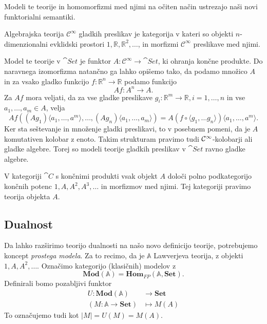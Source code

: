 \documentclass[../kategoricna_logika.tex]{subfiles}
\begin{document}
Modeli te teorije in homomorfizmi med njimi na očiten način ustrezajo naši novi
funktorialni semantiki.
\begin{primer}
Algebrajska teorija \(\mathcal{C}^{\infty}\) gladkih preslikav je kategorija
v kateri so objekti $n$-dimenzionalni evklidski prostori \(1, \mathbb{R}, \mathbb{R}^2, \ldots\),
in morfizmi \(\mathcal{C}^{\infty}\) preslikave med njimi.

Model te teorije v \(\cat{Set}\) je funktor \(A : \mathcal{C}^{\infty} \to \cat{Set}\),
ki ohranja končne produkte. Do naravnega izomorfizma natančno ga lahko opišemo tako, da
podamo množico \(A\) in za vsako gladko funkcijo \(f : \mathbb{R}^n \to \mathbb{R}\)
podamo funkcijo
\[Af : A^n \to A.\]
Za \(Af\) mora veljati, da za vse gladke preslikave
\(g_i : \mathbb{R}^m \to \mathbb{R}, i = 1, \ldots, n\) in vse \(a_1, \ldots, a_m \in A\),
velja
\[ 
   Af \left( (Ag_1)\langle a_1, \ldots, a^m \rangle, \ldots, (Ag_n)\langle a_1, \ldots, a_m \rangle \right) =
   A(f \circ \langle g_1, \ldots g_n \rangle)\langle a_1, \ldots, a^m \rangle.
\]
Ker sta seštevanje in množenje gladki preslikavi, to v posebnem pomeni,
da je \(A\) komutativen kolobar z enoto.
Takim strukturam pravimo tudi $\mathcal{C}\textsuperscript{\(\infty\)}$-kolobarji
ali gladke algebre. Torej so modeli teorije gladkih preslikav v $\cat{Set}$ ravno gladke algebre.
\end{primer}
%
\begin{primer}
V kategoriji \(\cat{C}\) s končnimi produkti vsak objekt \(A\) določi polno podkategorijo
končnih potenc \(1, A, A^2, A^3, \ldots\) in morfizmov med njimi. Tej kategoriji
pravimo teorija objekta \(A\).
\end{primer}
\subsection{Dualnost}
\label{sec:orgef98ac4}
Da lahko razširimo teorijo dualnosti na našo novo definicijo teorije, potrebujemo
koncept \emph{prostega modela}. Za to recimo, da je \(\mathbb{A}\) Lawverjeva teorija,
z objekti \(1, A, A^2, \ldots\). Označimo kategorijo (klasičnih) modelov z
\[ \mathbf{Mod}(\mathbb{A}) = \mathbf{Hom}_{FP}(\mathbb{A}, \mathbf{Set}). \]
Definirali bomo pozabljivi funktor
\begin{align*}
U : \mathbf{Mod}(\mathbb{A}) &\to \mathbf{Set} \\
(M : \mathbb{A} \to \mathbf{Set}) &\mapsto M(A)
\end{align*}
To označujemo tudi kot \(|M| = U(M) = M(A)\).
\end{document}
